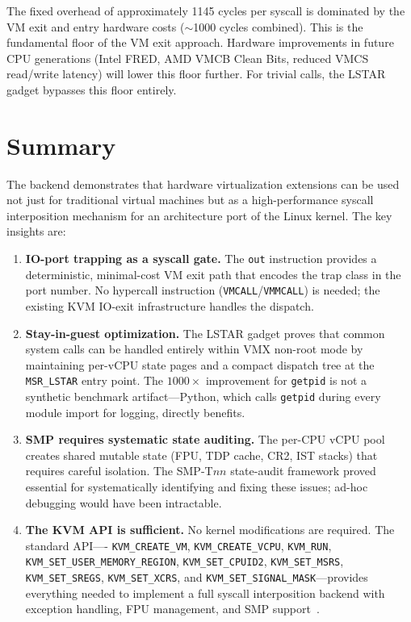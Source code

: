 \noindent
The fixed overhead of approximately \num{1145} cycles per syscall is
dominated by the VM exit and entry hardware costs ($\sim$\num{1000}
cycles combined).  This is the fundamental floor of the VM exit approach.
Hardware improvements in future CPU generations (Intel FRED, AMD VMCB
Clean Bits, reduced VMCS read/write latency) will lower this floor
further.  For trivial calls, the LSTAR gadget bypasses this floor entirely.


\section{Summary}
\label{sec:kvm-summary}

The \KVMvTwo{} backend demonstrates that hardware virtualization extensions
can be used not just for traditional virtual machines but as a high-performance
syscall interposition mechanism for an architecture port of the Linux kernel.
The key insights are:

\begin{enumerate}[leftmargin=2em]
  \item \textbf{IO-port trapping as a syscall gate.}
    The \texttt{out} instruction provides a deterministic, minimal-cost
    VM exit path that encodes the trap class in the port number.  No
    hypercall instruction (\texttt{VMCALL}/\texttt{VMMCALL}) is needed;
    the existing KVM IO-exit infrastructure handles the dispatch.

  \item \textbf{Stay-in-guest optimization.}
    The LSTAR gadget proves that common system calls can be handled
    entirely within VMX non-root mode by maintaining per-vCPU state pages
    and a compact dispatch tree at the \texttt{MSR\_LSTAR} entry point.
    The $1000\times$ improvement for \texttt{getpid} is not a synthetic
    benchmark artifact---Python, which calls \texttt{getpid} during
    every module import for logging, directly benefits.

  \item \textbf{SMP requires systematic state auditing.}
    The per-CPU vCPU pool creates shared mutable state (FPU, TDP cache,
    CR2, IST stacks) that requires careful isolation.  The SMP-T$nn$
    state-audit framework proved essential for systematically identifying
    and fixing these issues; ad-hoc debugging would have been
    intractable.

  \item \textbf{The KVM API is sufficient.}
    No kernel modifications are required.  The standard \KVM{} API----%
    \texttt{KVM\_CREATE\_VM}, \texttt{KVM\_CREATE\_VCPU}, \texttt{KVM\_RUN},
    \texttt{KVM\_SET\_USER\_MEMORY\_REGION}, \texttt{KVM\_SET\_CPUID2},
    \texttt{KVM\_SET\_MSRS}, \texttt{KVM\_SET\_SREGS},
    \texttt{KVM\_SET\_XCRS}, and \texttt{KVM\_SET\_SIGNAL\_MASK}---provides
    everything needed to implement a full syscall interposition backend
    with exception handling, FPU management, and SMP support~\cite{kvm-api}.
\end{enumerate}

